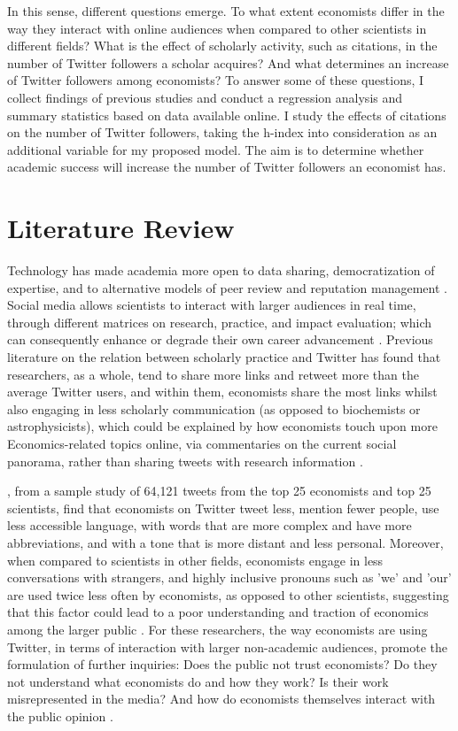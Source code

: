 \documentclass[12pt,english]{article}
\begin{document}
In this sense, different questions emerge. To what extent economists differ in the way they interact with online audiences when compared to other scientists in different fields? What is the effect of scholarly activity, such as citations, in the number of Twitter followers a scholar acquires? And what determines an increase of Twitter followers among economists? To answer some of these questions, I collect findings of previous studies and conduct a regression analysis and summary statistics based on data available online. I study the effects of citations on the number of Twitter followers, taking the h-index into consideration as an additional variable for my proposed model. The aim is to determine whether academic success will increase the number of Twitter followers an economist has. 

\section{Literature Review}\label{sec:litreview}
Technology has made academia more open to data sharing, democratization of expertise, and to alternative models of peer review and reputation management \citep{social.2014}. Social media allows scientists to interact with larger audiences in real time, through different matrices on research, practice, and impact evaluation; which can consequently enhance or degrade their own career advancement \citep{nyt.2012}. Previous literature on the relation between scholarly practice and Twitter has found that researchers, as a whole, tend to share more links and retweet more than the average Twitter users, and within them, economists share the most links whilst also engaging in less scholarly communication (as opposed to biochemists or astrophysicists), which could be explained by how economists touch upon more Economics-related topics online, via commentaries on the current social panorama, rather than sharing tweets with research information \citep{holmberg.2014}. 

\cite{giusta.2018}, from a sample study of 64,121 tweets from the top 25 economists and top 25 scientists, find that economists on Twitter tweet less, mention fewer people, use less accessible language, with words that are more complex and have more abbreviations, and with a tone that is more distant and less personal. Moreover, when compared to scientists in other fields, economists engage in less conversations with strangers, and highly inclusive pronouns such as 'we' and 'our' are used twice less often by economists, as opposed to other scientists, suggesting that this factor could lead to a poor understanding and traction of economics among the larger public \citep{giusta.2018}. For these researchers, the way economists are using Twitter, in terms of interaction with larger non-academic audiences, promote the formulation of further inquiries: Does the public not trust economists? Do they not understand what economists do and how they work? Is their work misrepresented in the media? And how do economists themselves interact with the public opinion \citep{t.economists}. 
\end{document}
